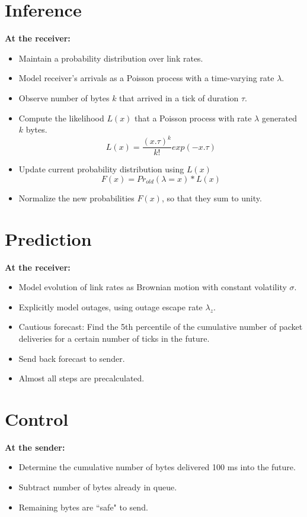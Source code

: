 \begin{multicols}{2}
\section*{Inference}
\begin{center}
\def\svgwidth{0.75 \columnwidth}{\large }
\end{center}
{\large \bf
At the receiver:
\begin{itemize}
\item Maintain a probability distribution over link rates.
\item Model receiver's arrivals as a Poisson process with a time-varying rate $\lambda$.
\item Observe number of bytes $k$ that arrived in a tick of duration $\tau$.
\item Compute the likelihood $L(x)$ that a Poisson process with rate $\lambda$ generated $k$ bytes.
      \begin{equation}
       L(x) = \frac{(x.\tau)^{k}}{k!}exp(-x.\tau)
      \end{equation}
\item Update current probability distribution using $L(x)$
      \begin{equation}
       F(x) = Pr_{old}(\lambda = x)*L(x)
      \end{equation}
\item Normalize the new probabilities $F(x)$, so that they sum to unity.
\end{itemize}
}

\section*{Prediction}
{\large \bf
At the receiver:
\begin{itemize}
\item Model evolution of link rates as Brownian motion with constant volatility $\sigma$.
\item Explicitly model outages, using outage escape rate $\lambda_{z}$.
\item Cautious forecast: Find the 5th percentile of the cumulative number of packet deliveries for a certain number of ticks in the future.
\item Send back forecast to sender.
\item Almost all steps are precalculated.
\end{itemize}
}


\section*{Control}
{\large \bf
At the sender:
\begin{itemize}
\item Determine the cumulative number of bytes delivered 100 ms into the future.
\item Subtract number of bytes already in queue.
\item Remaining bytes are ``safe" to send.
\end{itemize}
}


\end{multicols}
